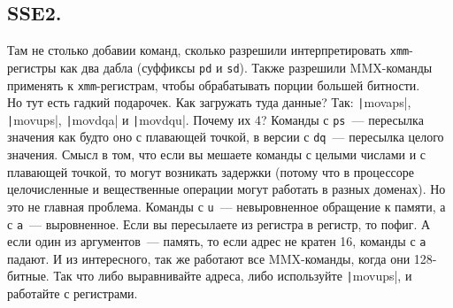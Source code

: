 \documentclass{article}
\begin{document}
    \subsection{SSE2.}
    Там не столько добавии команд, сколько разрешили интерпретировать \Verb|xmm|-регистры как два дабла (суффиксы \Verb|pd| и \Verb|sd|). Также разрешили MMX-команды применять к \Verb|xmm|-регистрам, чтобы обрабатывать порции большей битности.\\
    Но тут есть гадкий подарочек. Как загружать туда данные? Так: \texttt|movaps|, \texttt|movups|, \texttt|movdqa| и \texttt|movdqu|. Почему их 4? Команды с \Verb|ps|~--- пересылка значения как будто оно с плавающей точкой, в версии с \Verb|dq|~--- пересылка целого значения. Смысл в том, что если вы мешаете команды с целыми числами и с плавающей точкой, то могут возникать задержки (потому что в процессоре целочисленные и вещественные операции могут работать в разных доменах). Но это не главная проблема. Команды с \Verb|u|~--- невыровненное обращение к памяти, а с \Verb|a|~--- выровненное. Если вы пересылаете из регистра в регистр, то пофиг. А если один из аргументов~--- память, то если адрес не кратен 16, команды с \Verb|a| падают. И из интересного, так же работают все MMX-команды, когда они 128-битные. Так что либо выравнивайте адреса, либо используйте \texttt|movups|, и работайте с регистрами.
\end{document}
